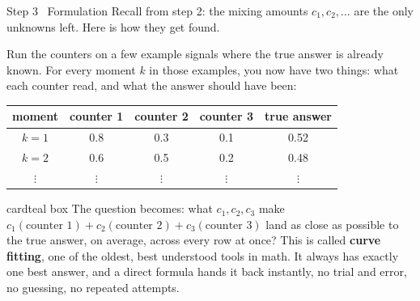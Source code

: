\documentclass[10pt,aspectratio=169]{beamer}
\newcommand{\saycard}[1]{%
  \begin{beamercolorbox}[wd=\linewidth,sep=0.9em,rounded=true]{cardteal box}
  #1
  \end{beamercolorbox}}
\begin{document}
\begin{frame}{Step 3 \textbar\ Formulation}
  \small Recall from step 2: the mixing amounts $c_1, c_2, \dots$ are the only unknowns left. Here is how they get found.

  \vspace{0.3em}
  Run the counters on a few example signals where the true answer is already known. For every moment $k$ in those examples, you now have two things: what each counter read, and what the answer should have been:

  \begin{center}
  \small
  \begin{tabular}{ccccc}
    \toprule
    moment & counter 1 & counter 2 & counter 3 & true answer \\
    \midrule
    $k{=}1$ & 0.8 & 0.3 & 0.1 & 0.52 \\
    $k{=}2$ & 0.6 & 0.5 & 0.2 & 0.48 \\
    $\vdots$ & $\vdots$ & $\vdots$ & $\vdots$ & $\vdots$ \\
    \bottomrule
  \end{tabular}
  \end{center}

  \vspace{0.3em}
  \saycard{The question becomes: what $c_1, c_2, c_3$ make $c_1(\text{counter 1}) + c_2(\text{counter 2}) + c_3(\text{counter 3})$ land as close as possible to the true answer, on average, across every row at once? This is called \textbf{curve fitting}, one of the oldest, best understood tools in math. It always has exactly one best answer, and a direct formula hands it back instantly, no trial and error, no guessing, no repeated attempts.}
\end{frame}
\end{document}

